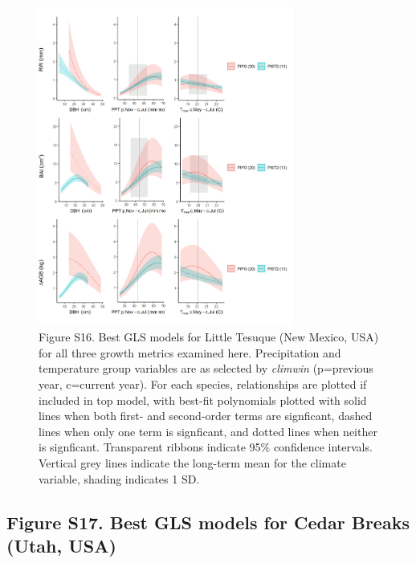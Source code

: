 \documentclass[
]{article}
\begin{document}
\begin{figure}
\centering
\includegraphics[width=0.75\textwidth,height=\textheight]{tables_figures/SI_figures/composite_plots/NewMexico.png}
\caption{Figure S16. Best GLS models for Little Tesuque (New Mexico,
USA) for all three growth metrics examined here. Precipitation and
temperature group variables are as selected by \emph{climwin}
(p=previous year, c=current year). For each species, relationships are
plotted if included in top model, with best-fit polynomials plotted with
solid lines when both first- and second-order terms are signficant,
dashed lines when only one term is signficant, and dotted lines when
neither is signficant. Transparent ribbons indicate 95\% confidence
intervals. Vertical grey lines indicate the long-term mean for the
climate variable, shading indicates 1 SD.}
\end{figure}

\newpage

\hypertarget{figure-s17.-best-gls-models-for-cedar-breaks-utah-usa}{%
\subsection{Figure S17. Best GLS models for Cedar Breaks (Utah,
USA)}\label{figure-s17.-best-gls-models-for-cedar-breaks-utah-usa}}
\end{document}

